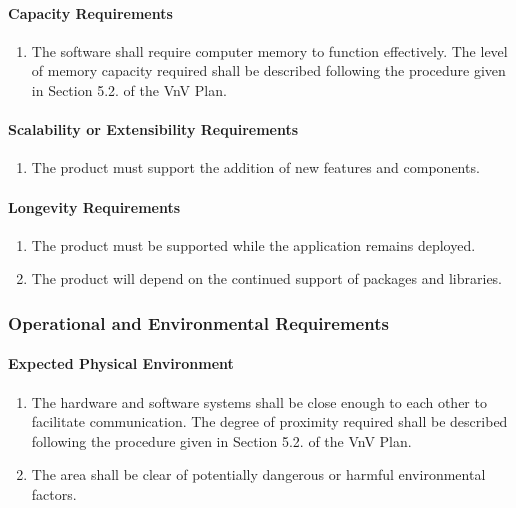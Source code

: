 \documentclass[12pt]{article}
\begin{document}
\paragraph{Capacity Requirements}
\begin{enumerate}[{PR}1., leftmargin=2\parindent, resume]
    \item The software shall require computer memory to function effectively. The level of memory capacity required shall be described following
    the procedure given in Section 5.2.\thevnvSectionNfr{} of the VnV Plan.
\end{enumerate}

\paragraph{Scalability or Extensibility Requirements}
\begin{enumerate}[{PR}1., leftmargin=2\parindent, resume]
    \item The product must support the addition of new features and components.
\end{enumerate}

\paragraph{Longevity Requirements}
\begin{enumerate}[{PR}1., leftmargin=2\parindent, resume]
    \item The product must be supported while the application remains deployed.
    \item The product will depend on the continued support of packages and libraries.
\end{enumerate}



\subsubsection{Operational and Environmental Requirements}
\label{NFR_OE}
\paragraph{Expected Physical Environment}
\begin{enumerate}[{OE}1., leftmargin=2\parindent]
    \item The hardware and software systems shall be close enough to each other to facilitate communication. The degree of proximity required 
    shall be described following the procedure given in Section 5.2.\thevnvSectionNfr{} of the VnV Plan.
    \item The area shall be clear of potentially dangerous or harmful environmental factors.
\end{enumerate}
\end{document}
